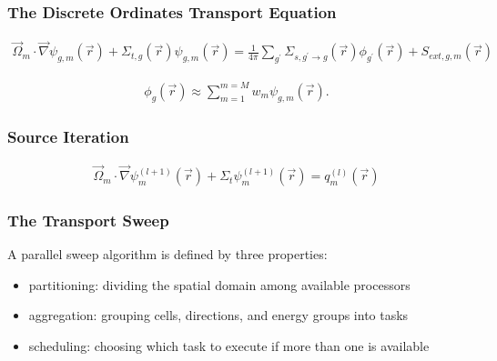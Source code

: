 \documentclass[]{beamer}
\newcommand{\vr}{\vec{r}}
\newcommand{\vo}{\vec{\Omega}}
\begin{document}
\begin{frame}[t]\frametitle{The Discrete Ordinates Transport Equation}
	\begin{block}{}
	\begin{align*}
	\vo_m \cdot \vec \nabla \psi_{g,m}(\vr) +\Sigma_{t,g}(\vr) \psi_{g,m}(\vr)  = \frac{1}{4\pi}\sum_{g^{\prime}}\Sigma_{s,g^{\prime}\to g}(\vr)\phi_{g^{\prime}}(\vr) + S_{ext,g,m}(\vr)
	\end{align*}
	\end{block}
	\begin{block}{}
	\begin{align*}
	\phi_g(\vr) \approx \sum_{m=1}^{m=M} w_m \psi_{g,m}(\vr).
	\end{align*}
	\end{block}
\end{frame}

\begin{frame}[t]\frametitle{Source Iteration}
\begin{block}{}
	\begin{align*}
	\vo_m \cdot \vec\nabla \psi_m^{(l+1)}(\vr) + \Sigma_t \psi_m^{(l+1)}(\vr) = q_m^{(l)}(\vr)
	\end{align*}
	\end{block}
\end{frame}

\begin{frame}[t]\frametitle{The Transport Sweep}
	\begin{block}{}
	A parallel sweep algorithm is defined by three properties:
	\begin{itemize}
		\item partitioning: dividing the spatial domain among available processors
		\item aggregation: grouping cells, directions, and energy groups into tasks
		\item scheduling: choosing which task to execute if more than one is available
	\end{itemize}
	\end{block}
	
\end{frame}
\end{document}
